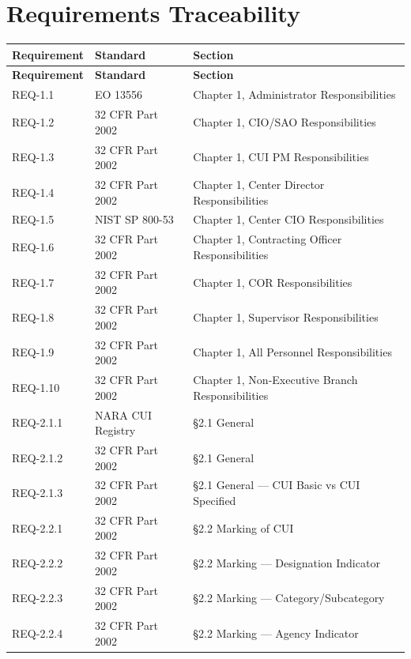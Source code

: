 \documentclass[11pt,letterpaper]{article}
\begin{document}
\section{Requirements Traceability}

\begin{longtable}{@{}l l p{8cm}@{}}
\toprule
\textbf{Requirement} & \textbf{Standard} & \textbf{Section} \\
\midrule
\endfirsthead
\toprule
\textbf{Requirement} & \textbf{Standard} & \textbf{Section} \\
\midrule
\endhead

REQ-1.1 & EO 13556 & Chapter 1, Administrator Responsibilities \\
REQ-1.2 & 32 CFR Part 2002 & Chapter 1, CIO/SAO Responsibilities \\
REQ-1.3 & 32 CFR Part 2002 & Chapter 1, CUI PM Responsibilities \\
REQ-1.4 & 32 CFR Part 2002 & Chapter 1, Center Director Responsibilities \\
REQ-1.5 & NIST SP 800-53 & Chapter 1, Center CIO Responsibilities \\
REQ-1.6 & 32 CFR Part 2002 & Chapter 1, Contracting Officer Responsibilities \\
REQ-1.7 & 32 CFR Part 2002 & Chapter 1, COR Responsibilities \\
REQ-1.8 & 32 CFR Part 2002 & Chapter 1, Supervisor Responsibilities \\
REQ-1.9 & 32 CFR Part 2002 & Chapter 1, All Personnel Responsibilities \\
REQ-1.10 & 32 CFR Part 2002 & Chapter 1, Non-Executive Branch Responsibilities \\
REQ-2.1.1 & NARA CUI Registry & \S2.1 General \\
REQ-2.1.2 & 32 CFR Part 2002 & \S2.1 General \\
REQ-2.1.3 & 32 CFR Part 2002 & \S2.1 General --- CUI Basic vs CUI Specified \\
REQ-2.2.1 & 32 CFR Part 2002 & \S2.2 Marking of CUI \\
REQ-2.2.2 & 32 CFR Part 2002 & \S2.2 Marking --- Designation Indicator \\
REQ-2.2.3 & 32 CFR Part 2002 & \S2.2 Marking --- Category/Subcategory \\
REQ-2.2.4 & 32 CFR Part 2002 & \S2.2 Marking --- Agency Indicator \\

\end{longtable}
\end{document}

